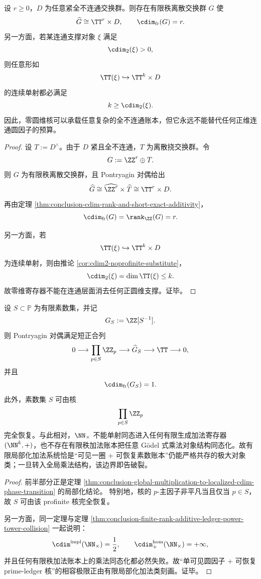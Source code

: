 \begin{theorem}[零维账本与正维支撑的严格正交分裂]\label{thm:conclusion-zero-dimensional-ledger-positive-support-orthogonality}
设 \(r\ge 0\)，\(D\) 为任意紧全不连通交换群。则存在有限秩离散交换群 \(G\) 使
\[
\widehat G\cong \TT^r\times D,
\qquad
\cdim_{\mathrm{fr}}(G)=r.
\]
另一方面，若某连通支撑对象 \(\xi\) 满足
\[
\cdim_2(\xi)>0,
\]
则任意形如
\[
\TT(\xi)\hookrightarrow \TT^k\times D
\]
的连续单射都必满足
\[
k\ge \cdim_2(\xi).
\]
因此，零圆维核可以承载任意复杂的全不连通账本，但它永远不能替代任何正维连通圆因子的预算。
\end{theorem}
\begin{proof}
设 \(T:=D^\wedge\)。由于 \(D\) 紧且全不连通，\(T\) 为离散挠交换群。令
\[
G:=\ZZ^r\oplus T.
\]
则 \(G\) 为有限秩离散交换群，且 Pontryagin 对偶给出
\[
\widehat G
\cong
\widehat{\ZZ^r}\times \widehat T
\cong
\TT^r\times D.
\]
再由定理 \ref{thm:conclusion-cdim-rank-and-short-exact-additivity}，
\[
\cdim_{\mathrm{fr}}(G)=\rank_{\ZZ}(G)=r.
\]

另一方面，若
\[
\TT(\xi)\hookrightarrow \TT^k\times D
\]
为连续单射，则由推论 \ref{cor:cdim2-noprofinite-substitute}，
\[
\cdim_2(\xi)=\dim\TT(\xi)\le k.
\]
故零维寄存器不能在连通层面消去任何正圆维支撑。证毕。
\end{proof}

\begin{corollary}[局部化加法系统是一圈可见包络的极大类]\label{cor:conclusion-localized-additive-systems-maximal-onecircle-class}
设 \(S\subset \mathbb P\) 为有限素数集，并记
\[
G_S:=\ZZ[S^{-1}].
\]
则 Pontryagin 对偶满足短正合列
\[
0\longrightarrow \prod_{p\in S}\ZZ_p
\longrightarrow \widehat G_S
\longrightarrow \TT
\longrightarrow 0,
\]
并且
\[
\cdim_{\mathrm{fr}}(G_S)=1.
\]
此外，素数集 \(S\) 可由核
\[
\prod_{p\in S}\ZZ_p
\]
完全恢复。与此相对，\(\NN_{\times}\) 不能单射同态进入任何有限生成加法寄存器 \((\NN^k,+)\)，也不存在有限秩加法账本把任意 Gödel 式乘法对象结构同态化。故有限局部化加法系统恰是“可见一圈 + 可恢复素数账本”仍能严格共存的极大对象类；一旦转入全局乘法结构，该边界即告破裂。
\end{corollary}
\begin{proof}
前半部分正是定理 \ref{thm:conclusion-global-multiplication-to-localized-cdim-phase-transition} 的局部化结论。
特别地，核的 \(p\)-主因子非平凡当且仅当 \(p\in S\)，故 \(S\) 可由该 profinite 核完全恢复。

另一方面，同一定理与定理 \ref{thm:conclusion-finite-rank-additive-ledger-power-tower-collision} 一起说明：
\[
\cdim^{\mathrm{impl}}(\NN_{\times})=\frac12,
\qquad
\cdim_{+}^{\mathrm{hom}}(\NN_{\times})=+\infty,
\]
并且任何有限秩加法账本上的乘法同态化都必然失败。故“单可见圆因子 + 可恢复 prime-ledger 核”的相容极限正由有限局部化加法类刻画。证毕。
\end{proof}


